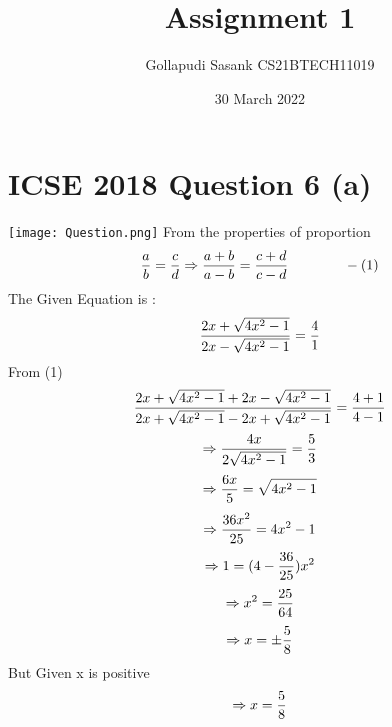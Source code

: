 \documentclass[12pt,twocolumn]{article}
\title{Assignment 1}
\author{Gollapudi Sasank CS21BTECH11019}
\date{30 March 2022}
\begin{document}
\maketitle
\section*{ICSE 2018 Question 6 (a)}
\texttt{[image: Question.png]}
From the properties of proportion \\ 
\begin{equation*}
     \frac{a}{b}  =  \frac{c}{d} 
     \Rightarrow 
     \frac{a+b}{a-b} = \frac{c+d}{c-d} \hspace{40pt} -(1) \\
\end{equation*}
The Given Equation is :
    \begin{equation*}
    \centering
        \frac{2x+\sqrt{4x^2-1}}{2x-\sqrt{4x^2-1}} = \frac {4}{1}
    \end{equation*}
    From (1) 
\begin{equation*}
        \frac {2x+\sqrt{4x^2-1}+2x-\sqrt{4x^2-1}}{2x+\sqrt{4x^2-1}-2x+\sqrt{4x^2-1}} = \frac {4+1}{4-1} \\
\end{equation*}
\begin{equation*}
        \Rightarrow
        \frac{4x}{2\sqrt{4x^2-1}} = \frac {5}{3} \\
\end{equation*}
\begin{equation*}
        \Rightarrow
        \frac{6x}{5} = \sqrt{4x^2-1} \\
\end{equation*}
\begin{equation*}
    \Rightarrow
        \frac{36x^2}{25} = 4x^2-1 \\
\end{equation*}
\begin{equation*}
        \Rightarrow
        1 = (4 - \frac{36}{25} )  x^2 \\
\end{equation*}
\begin{equation*}
    \Rightarrow
    x^2 =\frac{25}{64} \\ 
\end{equation*}
\begin{equation*}
    \Rightarrow
    x = \pm\frac{5}{8} \\
\end{equation*}
But Given x is positive 
\begin{equation*}
  \Rightarrow x = \frac{5}{8} \\  
\end{equation*}
\end{document}
